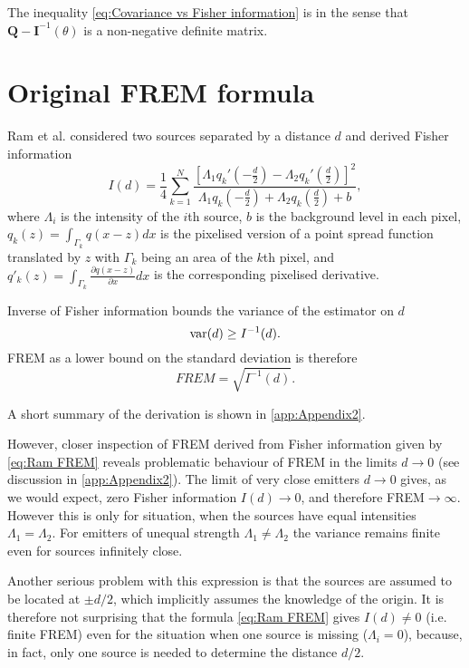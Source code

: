 The inequality \autoref{eq:Covariance vs Fisher information} is in the sense that $\bm{Q}-\bm{I}^{-1}(\theta)$ is a non-negative definite matrix.

\section{Original FREM formula\label{sec:FREM orig}}

Ram et al. \cite{Ram2006} considered two sources separated by a distance $d$ and derived Fisher information
%
\begin{equation}
	I(d)=\frac{1}{4}\sum_{k=1}^N\frac{\left[\Lambda_1q_k'(-\frac{d}{2})-\Lambda_2q_k'(\frac{d}{2})\right]^2}{\Lambda_1q_k(-\frac{d}{2})+\Lambda_2q_k(\frac{d}{2})+b},
	\label{eq:Ram FREM}
\end{equation}
%
where $\Lambda_i$ is the intensity of the $i$th source, $b$ is the background level in each pixel, $q_k(z)=\int_{\Gamma_k}q(x-z)dx$ is the pixelised version of a point spread function translated by $z$ with $\Gamma_k$ being an area of the $k$th pixel, and $q'_k(z)=\int_{\Gamma_k}\frac{\partial q(x-z)}{\partial x}dx$ is the corresponding pixelised derivative. 

Inverse of Fisher information bounds the variance of the estimator on $d$ 
%
\begin{equation}
	\mathrm{var}(d)\geq I^{-1}(d).
\end{equation}
%
FREM as a lower bound on the standard deviation is therefore
%
\begin{equation}
	\unit{FREM}=\sqrt{I^{-1}(d)}.
	\label{eq:FREM}	
\end{equation}

A short summary of the derivation is shown in \autoref{app:Appendix2}. 

However, closer inspection of FREM derived from Fisher information given by \autoref{eq:Ram FREM} reveals problematic behaviour of FREM in the limits $d\rightarrow 0$ (see discussion in \autoref{app:Appendix2}). The limit of very close emitters $d\rightarrow0$ gives, as we would expect, zero Fisher information $I(d)\rightarrow0$, and therefore FREM$\rightarrow\infty$. However this is only for situation, when the sources have equal intensities $\Lambda_1=\Lambda_2$. For emitters of unequal strength $\Lambda_1\neq\Lambda_2$ the variance remains finite even for sources infinitely close. 

Another serious problem with this expression is that the sources are assumed to be located at $\pm d/2$, which implicitly assumes the knowledge of the origin. It is therefore not surprising that the formula \autoref{eq:Ram FREM} gives $I(d)\neq0$ (i.e. finite FREM) even for the situation when one source is missing ($\Lambda_i=0$), because, in fact, only one source is needed to determine the distance $d/2$. 

